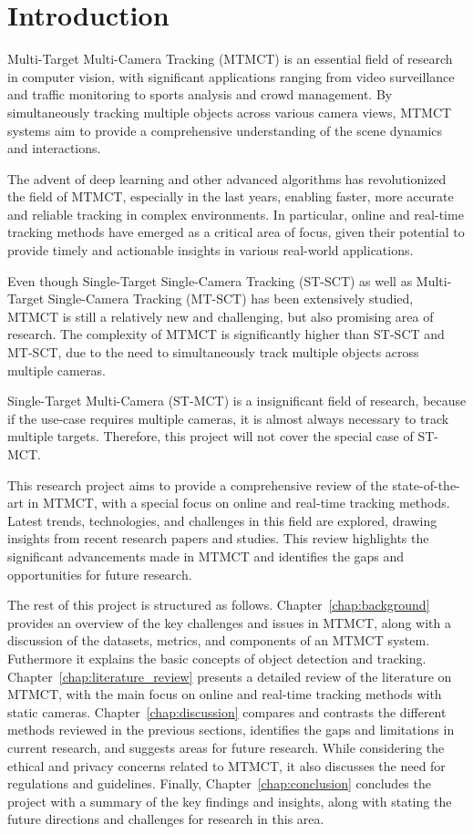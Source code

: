 \chapter{Introduction}\label{chap:introduction}
Multi-Target Multi-Camera Tracking (MTMCT) is an essential field of research in computer vision, with significant applications ranging from video surveillance and traffic monitoring to sports analysis and crowd management. By simultaneously tracking multiple objects across various camera views, MTMCT systems aim to provide a comprehensive understanding of the scene dynamics and interactions.

The advent of deep learning and other advanced algorithms has revolutionized the field of MTMCT, especially in the last years, enabling faster, more accurate and reliable tracking in complex environments. In particular, online and real-time tracking methods have emerged as a critical area of focus, given their potential to provide timely and actionable insights in various real-world applications.

Even though Single-Target Single-Camera Tracking (ST-SCT) as well as Multi-Target Single-Camera Tracking (MT-SCT) has been extensively studied, MTMCT is still a relatively new and challenging, but also promising area of research. The complexity of MTMCT is significantly higher than ST-SCT and MT-SCT, due to the need to simultaneously track multiple objects across multiple cameras.

Single-Target Multi-Camera (ST-MCT) is a insignificant field of research, because if the use-case requires multiple cameras, it is almost always necessary to track multiple targets. Therefore, this project will not cover the special case of ST-MCT.

This research project aims to provide a comprehensive review of the state-of-the-art in MTMCT, with a special focus on online and real-time tracking methods. Latest trends, technologies, and challenges in this field are explored, drawing insights from recent research papers and studies. This review highlights the significant advancements made in MTMCT and identifies the gaps and opportunities for future research.

The rest of this project is structured as follows. Chapter~\ref{chap:background} provides an overview of the key challenges and issues in MTMCT, along with a discussion of the datasets, metrics, and components of an MTMCT system. Futhermore it explains the basic concepts of object detection and tracking. Chapter~\ref{chap:literature_review} presents a detailed review of the literature on MTMCT, with the main focus on online and real-time tracking methods with static cameras. Chapter~\ref{chap:discussion} compares and contrasts the different methods reviewed in the previous sections, identifies the gaps and limitations in current research, and suggests areas for future research. While considering the ethical and privacy concerns related to MTMCT, it also discusses the need for regulations and guidelines. Finally, Chapter~\ref{chap:conclusion} concludes the project with a summary of the key findings and insights, along with stating the future directions and challenges for research in this area.

